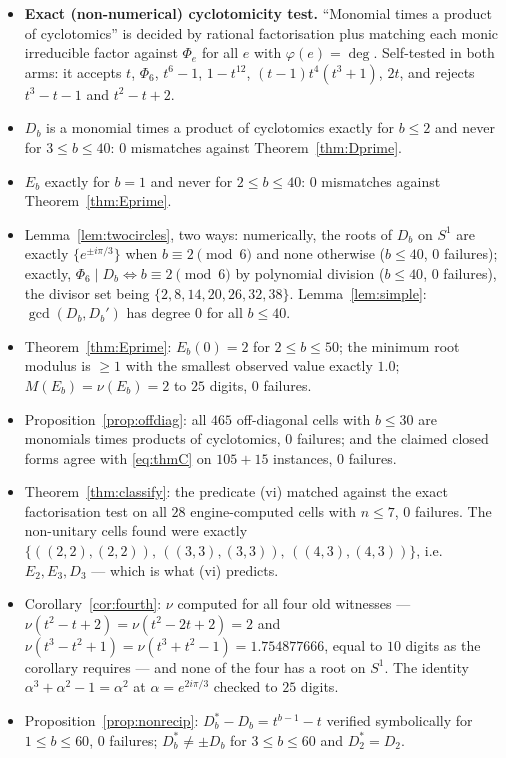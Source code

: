 \documentclass[11pt]{article}
\theoremstyle{definition}
\newcommand{\Scirc}{S^1}
\begin{document}
\begin{itemize}
\item \textbf{Exact (non-numerical) cyclotomicity test.} ``Monomial times a product of
cyclotomics'' is decided by rational factorisation plus matching each monic irreducible factor
against $\Phi_e$ for all $e$ with $\varphi(e)=\deg$. Self-tested in both arms: it accepts
$t$, $\Phi_6$, $t^6-1$, $1-t^{12}$, $(t-1)t^4(t^3+1)$, $2t$, and rejects $t^3-t-1$ and
$t^2-t+2$.
\item $D_b$ is a monomial times a product of cyclotomics exactly for $b\le2$ and never for
$3\le b\le40$: $0$ mismatches against Theorem~\ref{thm:Dprime}.
\item $E_b$ exactly for $b=1$ and never for $2\le b\le40$: $0$ mismatches against
Theorem~\ref{thm:Eprime}.
\item Lemma~\ref{lem:twocircles}, two ways: numerically, the roots of $D_b$ on $\Scirc$ are
exactly $\{e^{\pm i\pi/3}\}$ when $b\equiv2\pmod6$ and none otherwise ($b\le40$, $0$ failures);
exactly, $\Phi_6\mid D_b\iff b\equiv2\pmod6$ by polynomial division ($b\le40$, $0$ failures), the
divisor set being $\{2,8,14,20,26,32,38\}$. Lemma~\ref{lem:simple}: $\gcd(D_b,D_b')$ has degree
$0$ for all $b\le40$.
\item Theorem~\ref{thm:Eprime}: $E_b(0)=2$ for $2\le b\le50$; the minimum root modulus is $\ge1$
with the smallest observed value exactly $1.0$; $M(E_b)=\nu(E_b)=2$ to $25$ digits, $0$ failures.
\item Proposition~\ref{prop:offdiag}: all $465$ off-diagonal cells with $b\le30$ are monomials
times products of cyclotomics, $0$ failures; and the claimed closed forms agree with
\eqref{eq:thmC} on $105+15$ instances, $0$ failures.
\item Theorem~\ref{thm:classify}: the predicate (vi) matched against the exact factorisation test
on all $28$ engine-computed cells with $n\le7$, $0$ failures. The non-unitary cells found were
exactly $\{((2,2),(2,2)),\,((3,3),(3,3)),\,((4,3),(4,3))\}$, i.e.\ $E_2,E_3,D_3$ --- which is what
(vi) predicts.
\item Corollary~\ref{cor:fourth}: $\nu$ computed for all four old witnesses ---
$\nu(t^2-t+2)=\nu(t^2-2t+2)=2$ and $\nu(t^3-t^2+1)=\nu(t^3+t^2-1)=1.754877666$, equal to $10$
digits as the corollary requires --- and none of the four has a root on $\Scirc$. The identity
$\alpha^{3}+\alpha^{2}-1=\alpha^{2}$ at $\alpha=e^{2i\pi/3}$ checked to $25$ digits.
\item Proposition~\ref{prop:nonrecip}: $D_b^{*}-D_b=t^{b-1}-t$ verified symbolically for
$1\le b\le60$, $0$ failures; $D_b^{*}\ne\pm D_b$ for $3\le b\le60$ and $D_2^{*}=D_2$.
\end{itemize}
\end{document}
